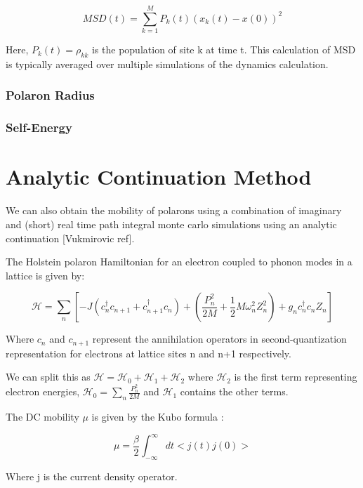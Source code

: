 \begin{equation}
    MSD(t) = \sum_{k=1}^{M} P_{k}(t) (x_{k}(t) - x(0))^2
\end{equation}

Here, $P_k(t) = \rho_{kk}$ is the population of site k at time t. This calculation of MSD is typically averaged over multiple simulations of the dynamics calculation.

\subsubsection{Polaron Radius}

\subsubsection{Self-Energy}

\section{Analytic Continuation Method}

We can also obtain the mobility of polarons using a combination of imaginary and (short) real time path integral monte carlo simulations using an analytic continuation [Vukmirovic ref]. 

 The Holstein polaron Hamiltonian for an electron coupled to phonon modes in a lattice is given by:

 \begin{equation}
    \mathcal{H} = \sum_n [-J(c_n^{\dag} c_{n+1} + c_{n+1}^{\dag}c_{n}) + (\frac{P_n^{2}}{2M} + \frac{1}{2}M\omega_n^{2} Z_{n}^{2}) + g_n c_n^{\dag}c_n Z_n]
 \end{equation}

 Where $c_n$ and $c_{n+1}$ represent the annihilation operators in second-quantization representation for electrons at lattice sites n and n+1 respectively.

 We can split this as $\mathcal{H} = \mathcal{H}_0 + \mathcal{H}_1 + \mathcal{H}_2$ where $\mathcal{H}_2$ is the first term representing electron energies, $\mathcal{H}_0 = \sum_n \frac{P_n^2}{2M}$ and $\mathcal{H}_1$ contains the other terms.

 The DC mobility $\mu$ is given by the Kubo formula :

 \begin{equation}
    \mu = \frac{\beta}{2} \int_{-\infty}^{\infty} dt<j(t)j(0)>
 \end{equation}

Where j is the current density operator. 

